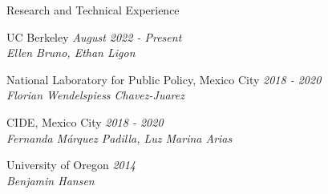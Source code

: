 \documentclass{resume} %
\begin{document}
\begin{rSection}{Research and Technical Experience}
\item UC Berkeley \hfill {\em August 2022 - Present} \\
\textit{Ellen Bruno, Ethan Ligon} \hfill

\item National Laboratory for Public Policy, Mexico City \hfill {\em 2018 - 2020}  \\
\textit{Florian Wendelspiess Chavez-Juarez} \hfill 
\item CIDE, Mexico City \hfill {\em 2018 - 2020} \\
\textit{Fernanda Márquez Padilla, Luz Marina Arias} \hfill
\item University of Oregon \hfill {\em 2014} \\
\textit{Benjamin Hansen} \hfill
\end{rSection}
\end{document}
